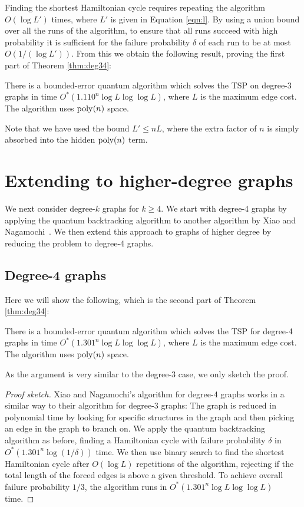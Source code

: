 Finding the shortest Hamiltonian cycle requires repeating the algorithm $O(\log L')$ times, where $L'$ is given in Equation \ref{eqn:l}. By using a union bound over all the runs of the algorithm, to ensure that all runs succeed with high probability it is sufficient for the failure probability $\delta$ of each run to be at most $O(1/(\log L'))$. From this we obtain the following result, proving the first part of Theorem \ref{thm:deg34}:

\begin{theorem}
There is a bounded-error quantum algorithm which solves the TSP on degree-3 graphs in time $O^*(1.110^n \log L \log \log L)$, where $L$ is the maximum edge cost. The algorithm uses $\operatorname{poly}(n)$ space.
\end{theorem}

Note that we have used the bound $L' \le n L$, where the extra factor of $n$ is simply absorbed into the hidden $\operatorname{poly}(n)$ term.

\section{Extending to higher-degree graphs \label{sec:higher-bound}}

We next consider degree-$k$ graphs for $k \ge 4$. We start with degree-4 graphs by applying the quantum backtracking algorithm to another algorithm by Xiao and Nagamochi~\cite{xiao2016degree4}. We then extend this approach to graphs of higher degree by reducing the problem to degree-4 graphs.

\subsection{Degree-4 graphs}

Here we will show the following, which is the second part of Theorem \ref{thm:deg34}:

\begin{theorem}
There is a bounded-error quantum algorithm which solves the TSP for degree-4 graphs in time $O^*(1.301^n\log L \log \log L)$, where $L$ is the maximum edge cost. The algorithm uses $\operatorname{poly}(n)$ space.
\end{theorem}

As the argument is very similar to the degree-3 case, we only sketch the proof.

\begin{proof}[Proof sketch]
Xiao and Nagamochi's algorithm for degree-4 graphs works in a similar way to their algorithm for degree-3 graphs: The graph is reduced in polynomial time by looking for specific structures in the graph and then picking an edge in the graph to branch on. We apply the quantum backtracking algorithm as before, finding a Hamiltonian cycle with failure probability $\delta$ in $O^*(1.301^n\log(1/\delta))$ time. We then use binary search to find the shortest Hamiltonian cycle after $O(\log L)$ repetitions of the algorithm, rejecting if the total length of the forced edges is above a given threshold. To achieve overall failure probability $1/3$, the algorithm runs in $O^*(1.301^n\log L\log \log L)$ time.
\end{proof}

